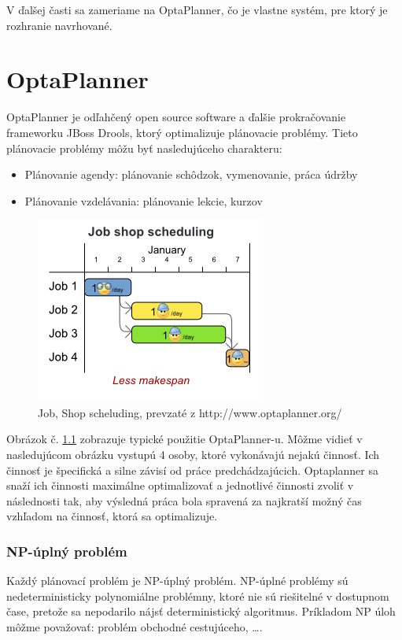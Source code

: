 V ďalšej časti sa zameriame na OptaPlanner, čo je vlastne systém, pre ktorý je rozhranie navrhované.




\chapter{OptaPlanner}
OptaPlanner je odľahčený open source software a ďalšie prokračovanie frameworku JBoss Drools, ktorý optimalizuje plánovacie problémy.\cite{optaweb} Tieto plánovacie problémy môžu byť nasledujúceho charakteru: 
\begin{itemize}
\item Plánovanie agendy: plánovanie schôdzok, vymenovanie, práca údržby
\item Plánovanie vzdelávania: plánovanie lekcie, kurzov
\end{itemize}
\begin{figure}[htb]

\begin{center}

\includegraphics[scale=0.5]{fig/useCaseOverview.jpg} 
\caption{Job, Shop scheluding, prevzaté z http://www.optaplanner.org/ }
\label{obrazokUseCase}

\end{center}

\end{figure}
Obrázok č. \ref{obrazokUseCase} zobrazuje typické použitie OptaPlanner-u. Môžme vidieť v nasledujúcom obrázku vystupú 4 osoby, ktoré vykonávajú nejakú činnosť. Ich činnosť je špecifická a silne závisí od práce predchádzajúcich. Optaplanner sa snaží ich činnosti maximálne optimalizovať a jednotlivé činnosti zvoliť v následnosti tak, aby výsledná práca bola spravená za najkratší možný čas vzhľadom na činnosť, ktorá sa optimalizuje.


\subsection{NP-úplný problém}
Každý plánovací problém je NP-úplný problém.\cite{npbook} NP-úplné problémy sú nedeterministicky polynomiálne problémny, ktoré nie sú riešitelné v dostupnom čase, pretože sa nepodarilo nájsť deterministický algoritmus. Príkladom NP úloh môžme považovať: problém obchodné cestujúceho, \ldots .


